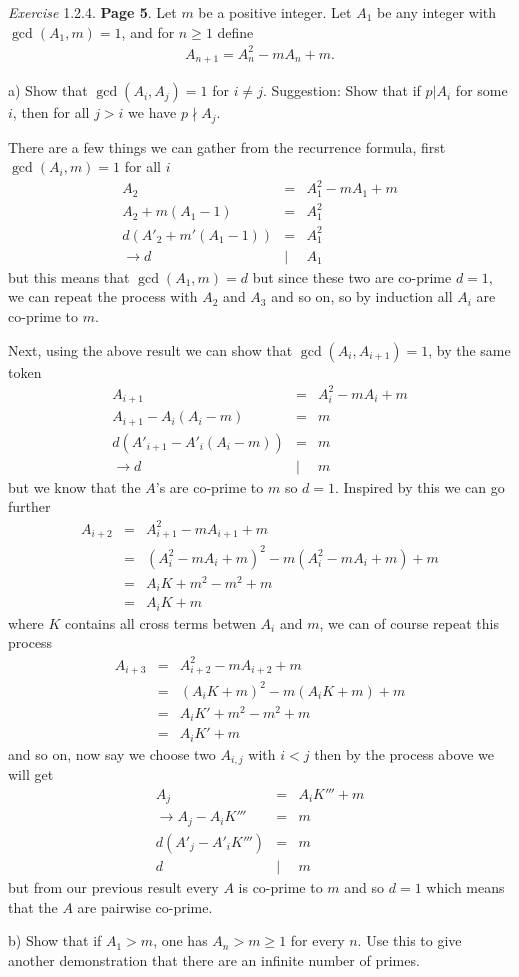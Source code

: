 \documentclass[aps,preprint,preprintnumbers,nofootinbib,showpacs,prd]{revtex4-1}
\newcommand{\nbea}{\begin{eqnarray*}}
\newcommand{\neea}{\end{eqnarray*}}
\begin{document}
{\it Exercise} 1.2.4. {\bf Page 5}. Let $m$ be a positive integer. Let $A_1$ be any integer with $\gcd(A_1 , m) = 1$, and for $n \ge 1$ deﬁne
%
\nbea
A_{n+1} = A^2_n - mA_n + m.
\neea
%

a) Show that $\gcd(A_i , A_j ) = 1$ for $i \neq j$. Suggestion: Show that if $p | A_i$ for some $i$, then for all $j > i$ we have $p \nmid A_j$.

There are a few things we can gather from the recurrence formula, first $\gcd(A_i, m) = 1$ for all $i$
%
\nbea
A_2 & = & A^2_1 - mA_1 + m \\
A_2 + m(A_1 - 1) & = & A^2_1 \\
d(A'_2 + m'(A_1-1)) & = & A^2_1 \\
\to d &|& A_1
\neea
%
but this means that $\gcd(A_1, m) = d$ but since these two are co-prime $d=1$, we can repeat the process with $A_2$ and $A_3$ and so on, so by induction all $A_i$ are co-prime to $m$.

Next, using the above result we can show that $\gcd(A_i, A_{i+1}) = 1$, by the same token
%
\nbea
A_{i+1} & = & A^2_{i} - mA_i + m \\
A_{i+1} - A_{i}(A_{i} - m) & = & m \\
d(A'_{i+1} - A'_{i}(A_{i} - m)) & = & m \\
\to d &|& m
\neea
%
but we know that the $A$'s are co-prime to $m$ so $d=1$. Inspired by this we can go further
%
\nbea
A_{i+2} & = & A_{i+1}^2 - mA_{i+1} + m \\
& = & (A_i^2 - mA_i + m)^2 - m(A_i^2 - mA_i + m) + m \\
& = & A_i K + m^2 - m^2 + m \\
& = & A_i K + m
\neea
%
where $K$ contains all cross terms betwen $A_i$ and $m$, we can of course repeat this process
%
\nbea
A_{i+3} & = & A_{i+2}^2 - mA_{i+2} + m \\
& = & (A_iK + m)^2 - m(A_iK + m) + m \\
& = & A_iK' + m^2 - m^2 + m \\
& = & A_iK' + m
\neea
%
and so on, now say we choose two $A_{i,j}$ with $i<j$ then by the process above we will get
%
\nbea
A_j & = & A_iK''' + m \\
\to A_j - A_i K''' & = & m \\
d(A'_j - A'_iK''') & = & m \\
d &|& m
\neea
%
but from our previous result every $A$ is co-prime to $m$ and so $d=1$ which means that the $A$ are pairwise co-prime.

b) Show that if $A_1 > m$, one has $A_n > m \ge 1$ for every $n$. Use this to give another demonstration that there are an inﬁnite number of primes.
\end{document}
